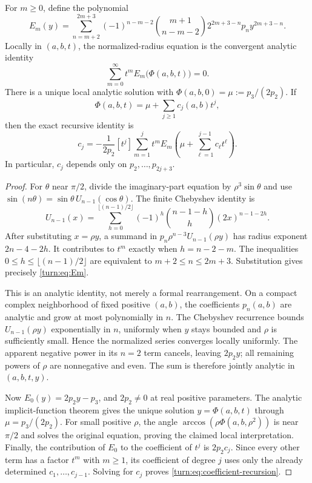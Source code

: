 \begin{proposition}
\label{turn:prop:recurrence}
For $m\ge0$, define the polynomial
\begin{equation}
 E_m(y)=\sum_{n=m+2}^{2m+3}
  (-1)^{n-m-2}\binom{m+1}{n-m-2}
  2^{2m+3-n}p_n y^{2m+3-n}.
 \label{turn:eq:Em}
\end{equation}
Locally in $(a,b,t)$, the normalized-radius equation is the convergent
analytic identity
\begin{equation}
 \sum_{m=0}^{\infty}t^mE_m\bigl(\Phi(a,b,t)\bigr)=0.
 \label{turn:eq:implicit}
\end{equation}
There is a unique local analytic solution with
$\Phi(a,b,0)=\mu:=p_3/(2p_2)$.  If
\[
 \Phi(a,b,t)=\mu+\sum_{j\ge1}c_j(a,b)t^j,
\]
then the exact recursive identity is
\begin{equation}
 c_j=-\frac{1}{2p_2}[t^j]
 \sum_{m=1}^{j}t^m E_m\left(
   \mu+\sum_{\ell=1}^{j-1}c_\ell t^\ell\right).
 \label{turn:eq:coefficient-recursion}
\end{equation}
In particular, $c_j$ depends only on $p_2,\ldots,p_{2j+3}$.
\end{proposition}

\begin{proof}
For $\theta$ near $\pi/2$, divide the imaginary-part equation by
$\rho^3\sin\theta$ and use
$\sin(n\theta)=\sin\theta\,U_{n-1}(\cos\theta)$.  The finite Chebyshev
identity is
\[
 U_{n-1}(x)=\sum_{h=0}^{\lfloor(n-1)/2\rfloor}
  (-1)^h\binom{n-1-h}{h}(2x)^{n-1-2h}.
\]
After substituting $x=\rho y$, a summand in
$p_n\rho^{n-3}U_{n-1}(\rho y)$ has radius exponent
$2n-4-2h$.  It contributes to $t^m$ exactly when $h=n-2-m$.
The inequalities $0\le h\le\lfloor(n-1)/2\rfloor$ are equivalent to
$m+2\le n\le2m+3$.  Substitution gives precisely
\eqref{turn:eq:Em}.

This is an analytic identity, not merely a formal rearrangement.
On a compact complex neighborhood of fixed positive $(a,b)$, the
coefficients $p_n(a,b)$ are analytic and grow at most polynomially in
$n$.  The Chebyshev recurrence bounds $U_{n-1}(\rho y)$ exponentially
in $n$, uniformly when $y$ stays bounded and $\rho$ is sufficiently
small.  Hence the normalized series converges locally uniformly.  The
apparent negative power in its $n=2$ term cancels, leaving $2p_2y$;
all remaining powers of $\rho$ are nonnegative and even.  The sum is
therefore jointly analytic in $(a,b,t,y)$.

Now $E_0(y)=2p_2y-p_3$, and $2p_2\ne0$ at real positive parameters.
The analytic implicit-function theorem gives the unique solution
$y=\Phi(a,b,t)$ through $\mu=p_3/(2p_2)$.  For small positive $\rho$,
the angle $\arccos(\rho\Phi(a,b,\rho^2))$ is near $\pi/2$ and solves
the original equation, proving the claimed local interpretation.
Finally, the contribution of $E_0$ to the coefficient of $t^j$ is
$2p_2c_j$.  Since every other term has a factor $t^m$ with $m\ge1$,
its coefficient of degree $j$ uses only the already determined
$c_1,\ldots,c_{j-1}$.  Solving for $c_j$ proves
\eqref{turn:eq:coefficient-recursion}.
\end{proof}

